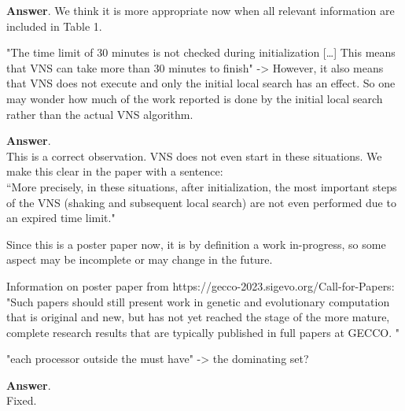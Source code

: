 \documentclass [11pt]{scrartcl}
\begin{document}
\textbf{Answer}.
We think it is more appropriate now when all relevant information are included in Table 1.

\begin{leftbar}
"The time limit of 30 minutes is not checked during initialization […] This means that VNS can take more than 30 minutes to finish"
-> However, it also means that VNS does not execute and only the initial local search has an effect. So one may wonder how much of the work reported is done by the initial local search rather than the actual VNS algorithm.
\end{leftbar}

\textbf{Answer}. \\
This is a correct observation. VNS does not even start in these situations. 
We make this clear in the paper with a sentence:\\
``More precisely, in these situations, after initialization, the most important steps of the VNS (shaking and subsequent local search) are not even performed due to an expired time limit."
 
Since this is a poster paper now, it is by definition a work in-progress, so some aspect may be incomplete or may change in the future. 

Information on poster paper from https://gecco-2023.sigevo.org/Call-for-Papers: \\"Such papers should still present work in genetic and evolutionary computation that is original and new, but has not yet reached the stage of the more mature, complete research results that are typically published in full papers at GECCO. " 

\begin{leftbar}
"each processor outside the must have" -> the dominating set?
\end{leftbar}

\textbf{Answer}. \\
Fixed. 
\end{document}
